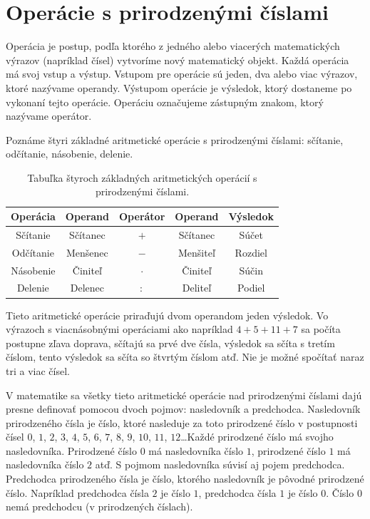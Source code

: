\documentclass{report}
\begin{document}
\section{Operácie s prirodzenými číslami}

Operácia je postup, podľa ktorého z jedného alebo viacerých matematických výrazov (napríklad čísel) vytvoríme nový matematický objekt. Každá operácia má svoj vstup a výstup. Vstupom pre operácie sú jeden, dva alebo viac výrazov, ktoré nazývame operandy. Výstupom operácie je výsledok, ktorý dostaneme po vykonaní tejto operácie. Operáciu označujeme zástupným znakom, ktorý nazývame operátor.

Poznáme štyri základné aritmetické operácie s prirodzenými číslami: sčítanie, odčítanie, násobenie, delenie.

\begin{table}[H]
  \centering
  \renewcommand{\arraystretch}{1.3}
  \begin{tabular}{c|c|c|c|c}
    Operácia & Operand & Operátor & Operand & Výsledok \\
    \hline
    Sčítanie & Sčítanec & \(+\) & Sčítanec & Súčet \\
    Odčítanie & Menšenec & \(-\) & Menšiteľ & Rozdiel \\
    Násobenie & Činiteľ & \(\cdot\) & Činiteľ & Súčin \\
    Delenie & Delenec & \(:\) & Deliteľ & Podiel \\
  \end{tabular}
  \caption{Tabuľka štyroch základných aritmetických operácií s prirodzenými číslami.}
\end{table}

Tieto aritmetické operácie priraďujú dvom operandom jeden výsledok. Vo výrazoch s viacnásobnými operáciami ako napríklad \(4 + 5 + 11 + 7\) sa počíta postupne zľava doprava, sčítajú sa prvé dve čísla, výsledok sa sčíta s tretím číslom, tento výsledok sa sčíta so štvrtým číslom atď. Nie je možné spočítať naraz tri a viac čísel.

V matematike sa všetky tieto aritmetické operácie nad prirodzenými číslami dajú presne definovať pomocou dvoch pojmov: nasledovník a predchodca. Nasledovník prirodzeného čísla je číslo, ktoré nasleduje za toto prirodzené číslo v postupnosti čísel \(0\), \(1\), \(2\), \(3\), \(4\), \(5\), \(6\), \(7\), \(8\), \(9\), \(10\), \(11\), \(12\)\dots Každé prirodzené číslo má svojho nasledovníka. Prirodzené číslo \(0\) má nasledovníka číslo \(1\), prirodzené číslo \(1\) má nasledovníka číslo \(2\) atď. S pojmom nasledovníka súvisí aj pojem predchodca. Predchodca prirodzeného čísla je číslo, ktorého nasledovník je pôvodné prirodzené číslo. Napríklad predchodca čísla \(2\) je číslo \(1\), predchodca čísla \(1\) je číslo \(0\). Číslo \(0\) nemá predchodcu (v prirodzených číslach).
\end{document}
